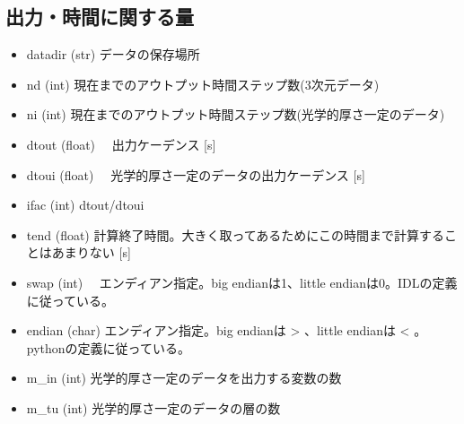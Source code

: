 \documentclass[letterpaper,10pt,dvipdfmx,report]{sphinxmanual}
\begin{document}
\subsection{出力・時間に関する量}
\label{\detokenize{notation:id1}}\begin{itemize}
\item {} 
datadir (str) \sphinxhyphen{}\sphinxhyphen{} データの保存場所

\item {} 
nd (int) \sphinxhyphen{}\sphinxhyphen{} 現在までのアウトプット時間ステップ数(3次元データ)

\item {} 
ni (int) \sphinxhyphen{}\sphinxhyphen{} 現在までのアウトプット時間ステップ数(光学的厚さ一定のデータ)

\item {} 
dtout (float) \sphinxhyphen{}\sphinxhyphen{}　出力ケーデンス {[}s{]}

\item {} 
dtoui (float) \sphinxhyphen{}\sphinxhyphen{}　光学的厚さ一定のデータの出力ケーデンス {[}s{]}

\item {} 
ifac (int) \sphinxhyphen{}\sphinxhyphen{} dtout/dtoui

\item {} 
tend (float) \sphinxhyphen{}\sphinxhyphen{} 計算終了時間。大きく取ってあるためにこの時間まで計算することはあまりない {[}s{]}

\item {} 
swap (int) \sphinxhyphen{}\sphinxhyphen{}　エンディアン指定。big endianは1、little endianは0。IDLの定義に従っている。

\item {} 
endian (char) \sphinxhyphen{}\sphinxhyphen{} エンディアン指定。big endianは \textgreater{} 、little endianは \textless{} 。pythonの定義に従っている。

\item {} 
m\_in (int) \sphinxhyphen{}\sphinxhyphen{} 光学的厚さ一定のデータを出力する変数の数

\item {} 
m\_tu (int) \sphinxhyphen{}\sphinxhyphen{} 光学的厚さ一定のデータの層の数

\end{itemize}
\end{document}
